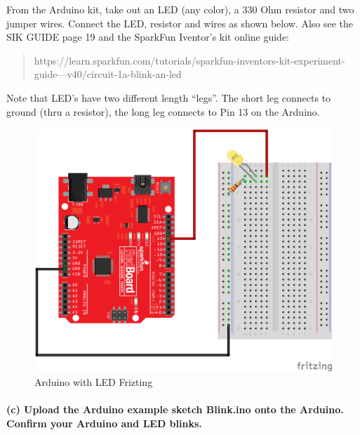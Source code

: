 \documentclass[11pt]{article}
\begin{document}
From the Arduino kit, take out an LED (any color), a 330 Ohm resistor
and two jumper wires. Connect the LED, resistor and wires as shown
below. Also see the SIK GUIDE page 19 and the SparkFun Iventor's kit
online guide:

\begin{quote}
https://learn.sparkfun.com/tutorials/sparkfun-inventors-kit-experiment-guide---v40/circuit-1a-blink-an-led
\end{quote}

Note that LED's have two different length ``legs''. The short leg
connects to ground (thru a resistor), the long leg connects to Pin 13 on
the Arduino.

\begin{figure}
\centering
\includegraphics{images/Arduino_LED_fritzing.png}
\caption{Arduino with LED Frizting}
\end{figure}

    \hypertarget{c-upload-the-arduino-example-sketch-blink.ino-onto-the-arduino.-confirm-your-arduino-and-led-blinks.}{%
\paragraph{\texorpdfstring{(c) Upload the Arduino example sketch
\textbf{Blink.ino} onto the Arduino. Confirm your Arduino and LED
blinks.}{(c) Upload the Arduino example sketch Blink.ino onto the Arduino. Confirm your Arduino and LED blinks.}}\label{c-upload-the-arduino-example-sketch-blink.ino-onto-the-arduino.-confirm-your-arduino-and-led-blinks.}}
\end{document}
